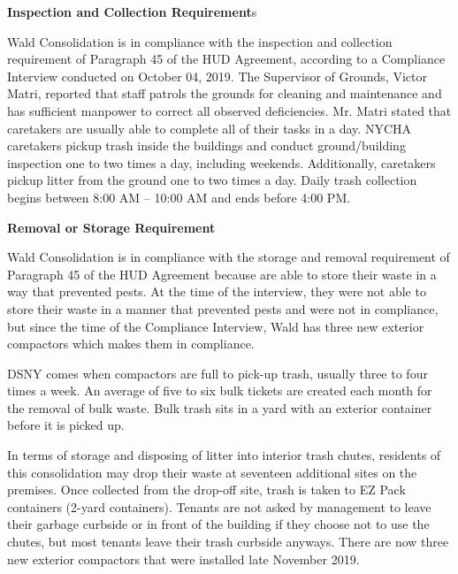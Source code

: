 


\textbf{Inspection and Collection Requirement}s 

Wald Consolidation is in compliance with the inspection and collection requirement of Paragraph 45 of the HUD Agreement, according to a Compliance Interview conducted on October 04, 2019. The Supervisor of Grounds, Victor Matri, reported that staff patrols the grounds for cleaning and maintenance and has sufficient manpower to correct all observed deficiencies. Mr. Matri stated that caretakers are usually able to complete all of their tasks in a day.  NYCHA caretakers pickup trash inside the buildings and conduct ground/building inspection one to two times a day, including weekends. Additionally, caretakers pickup litter from the ground one to two times a day. Daily trash collection begins between 8:00 AM -- 10:00 AM and ends before 4:00 PM. 

 

\textbf{Removal or Storage Requirement} 

Wald Consolidation is in compliance with the storage and removal requirement of Paragraph 45 of the HUD Agreement because are able to store their waste in a way that prevented pests. At the time of the interview, they were not able to store their waste in a manner that prevented pests and were not in compliance, but since the time of the Compliance Interview, Wald has three new exterior compactors which makes them in compliance. 



DSNY comes when compactors are full to pick-up trash, usually three to four times a week. An average of five to six bulk tickets are created each month for the removal of bulk waste. Bulk trash sits in a yard with an exterior container before it is picked up.  

 

In terms of storage and disposing of litter into interior trash chutes, residents of this consolidation may drop their waste at seventeen additional sites on the premises. Once collected from the drop-off site, trash is taken to EZ Pack containers (2-yard containers). Tenants are not asked by management to leave their garbage curbside or in front of the building if they choose not to use the chutes, but most tenants leave their trash curbside anyways. There are now three new exterior compactors that were installed late November 2019. 

 

